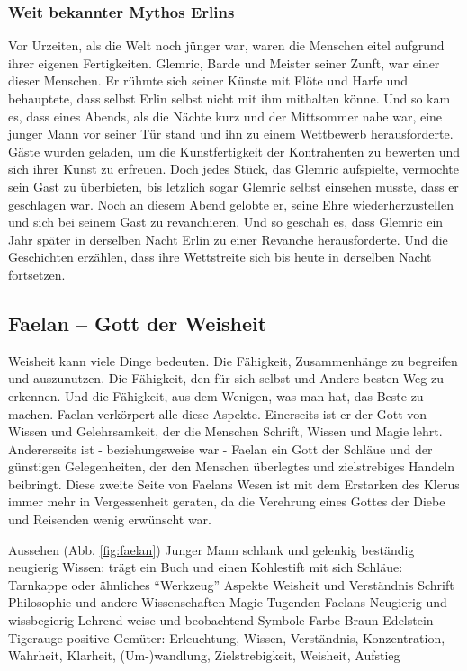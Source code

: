 \subsubsection{Weit bekannter Mythos Erlins}
Vor Urzeiten, als die Welt noch jünger war, waren die Menschen eitel aufgrund ihrer eigenen Fertigkeiten. 
Glemric, Barde und Meister seiner Zunft, war einer dieser Menschen. 
Er rühmte sich seiner Künste mit Flöte und Harfe und behauptete, dass selbst Erlin selbst nicht mit ihm mithalten könne.
Und so kam es, dass eines Abends, als die Nächte kurz und der Mittsommer nahe war, eine junger Mann vor seiner Tür stand und ihn zu einem Wettbewerb herausforderte. 
Gäste wurden geladen, um die Kunstfertigkeit der Kontrahenten zu bewerten und sich ihrer Kunst zu erfreuen. 
Doch jedes Stück, das Glemric aufspielte, vermochte sein Gast zu überbieten, bis letzlich sogar Glemric selbst einsehen musste, dass er geschlagen war. 
Noch an diesem Abend gelobte er, seine Ehre wiederherzustellen und sich bei seinem Gast zu revanchieren. 
Und so geschah es, dass Glemric ein Jahr später in derselben Nacht Erlin zu einer Revanche herausforderte. 
Und die Geschichten erzählen, dass ihre Wettstreite sich bis heute in derselben Nacht fortsetzen.





\subsection{Faelan -- Gott der Weisheit}
Weisheit kann viele Dinge bedeuten. 
Die Fähigkeit, Zusammenhänge zu begreifen und auszunutzen. 
Die Fähigkeit, den für sich selbst und Andere besten Weg zu erkennen. 
Und die Fähigkeit, aus dem Wenigen, was man hat, das Beste zu machen. 
Faelan verkörpert alle diese Aspekte. 
Einerseits ist er der Gott von Wissen und Gelehrsamkeit, der die Menschen Schrift, Wissen und Magie lehrt. 
Andererseits ist - beziehungsweise war - Faelan ein Gott der Schläue und der günstigen Gelegenheiten, der den Menschen überlegtes und zielstrebiges Handeln beibringt. 
Diese zweite Seite von Faelans Wesen ist mit dem Erstarken des Klerus immer mehr in Vergessenheit geraten, da die Verehrung eines Gottes der Diebe und Reisenden wenig erwünscht war.
\begin{outline}
	\1 Aussehen (Abb. \ref{fig:faelan})
		\2 Junger Mann 
		\2 schlank und gelenkig
		\2 beständig neugierig
		\2 Wissen: trägt ein Buch und einen Kohlestift mit sich
		\2 Schläue: Tarnkappe oder ähnliches ``Werkzeug''
	\1 Aspekte
		\2 Weisheit und Verständnis
		\2 Schrift
		\2 Philosophie und andere Wissenschaften
		\2 Magie
	\1 Tugenden Faelans
		\2 Neugierig und wissbegierig
		\2 Lehrend
		\2 weise und beobachtend
	\1 Symbole
		\2 Farbe Braun
		\2 Edelstein Tigerauge
	\1 positive Gemüter: Erleuchtung, Wissen, Verständnis, Konzentration, Wahrheit, Klarheit, (Um-)wandlung, Zielstrebigkeit, Weisheit, Aufstieg
\end{outline}
